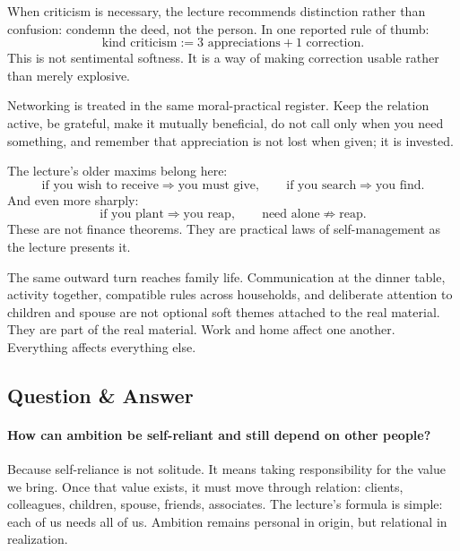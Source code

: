 When criticism is necessary, the lecture recommends distinction rather than confusion: condemn the deed, not the person. In one reported rule of thumb:
\begin{equation}
\text{kind criticism} := 3 \text{ appreciations} + 1 \text{ correction}.
\end{equation}
This is not sentimental softness. It is a way of making correction usable rather than merely explosive.

Networking is treated in the same moral-practical register. Keep the relation active, be grateful, make it mutually beneficial, do not call only when you need something, and remember that appreciation is not lost when given; it is invested.

The lecture's older maxims belong here:
\begin{equation}
\text{if you wish to receive} \Rightarrow \text{you must give},
\qquad
\text{if you search} \Rightarrow \text{you find}.
\end{equation}
And even more sharply:
\begin{equation}
\text{if you plant} \Rightarrow \text{you reap}, \qquad
\text{need alone} \not\Rightarrow \text{reap}.
\end{equation}
These are not finance theorems. They are practical laws of self-management as the lecture presents it.

The same outward turn reaches family life. Communication at the dinner table, activity together, compatible rules across households, and deliberate attention to children and spouse are not optional soft themes attached to the real material. They are part of the real material. Work and home affect one another. Everything affects everything else.

\subsection{Question \& Answer}

\paragraph{How can ambition be self-reliant and still depend on other people?}
Because self-reliance is not solitude. It means taking responsibility for the value we bring. Once that value exists, it must move through relation: clients, colleagues, children, spouse, friends, associates. The lecture's formula is simple: each of us needs all of us. Ambition remains personal in origin, but relational in realization.

